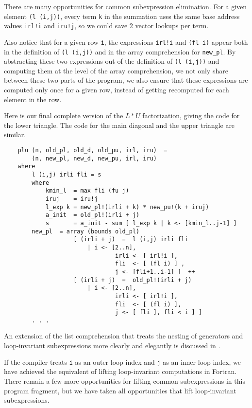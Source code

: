 There are many opportunities for common subexpression
elimination.  For a given element {\tt (l (i,j))}, every term {\tt k}
in the summation uses the same base address values {\tt irl!i} and
{\tt iru!j}, so we could save 2 vector lookups per term.

Also notice that for a given row {\tt i}, the expressions
{\tt irl!i} and {\tt (fl i)} appear both in the definition of
{\tt (l (i,j))} and in the array comprehension for {\tt new\_pl}.
By abstracting these two expressions out of the definition of
{\tt (l (i,j))} and computing them at the level of the array  
comprehension,
we not only share between these two parts of the program, we also
ensure that these expressions are computed only once for a given row,
instead of getting recomputed for each element in the row.

Here is our final complete version of the $L*U$ factorization,
giving the code for the lower triangle.  The code for the main
diagonal and the upper triangle are similar.

\begin{verbatim}
    plu (n, old_pl, old_d, old_pu, irl, iru)  =
        (n, new_pl, new_d, new_pu, irl, iru)
    where
        l (i,j) irli fli = s
        where
            kmin_l  = max fli (fu j)
            iruj    = iru!j
            l_exp k = new_pl!(irli + k) * new_pu!(k + iruj)
            a_init  = old_pl!(irli + j)
            s       = a_init - sum [ l_exp k | k <- [kmin_l..j-1] ]
        new_pl  = array (bounds old_pl)
                    [ (irli + j)  =  l (i,j) irli fli
                        | i <- [2..n],
                                irli <- [ irl!i ],
                                fli  <- [ (fl i) ] ,
                                j <- [fli+1..i-1] ]  ++
                    [ (irli + j)  =  old_pl!(irli + j)
                        | i <- [2..n],
                                irli <- [ irl!i ],
                                fli  <- [ (fl i) ],
                                j <- [ fli ], fli < i ] ]
        . . .
\end{verbatim}

An extension of the list comprehension that treats the nesting of
generators and loop-invariant subexpressions more clearly and
elegantly is discussed in \cite{ande89,ande89b}.

If the compiler treats {\tt i} as an outer loop index and {\tt j} as
an inner loop index, we have achieved the equivalent of lifting
loop-invariant computations in Fortran.  There remain a few more
opportunities for lifting common subexpressions in this program
fragment, but we have taken all opportunities that lift
loop-invariant subexpressions.

